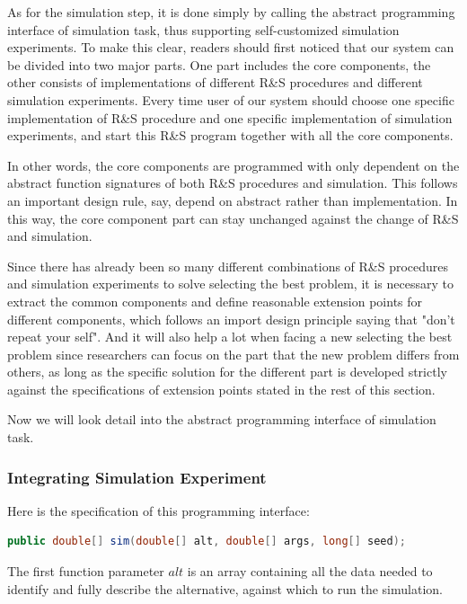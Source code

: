As for the simulation step, it is done simply by calling the abstract programming interface of simulation task, thus supporting self-customized simulation experiments. To make this clear, readers should first noticed that our system can be divided into two major parts. One part includes the core components, the other consists of implementations of different R\&S procedures and different simulation experiments. Every time user of our system should choose one specific implementation of R\&S procedure and one specific implementation of simulation experiments, and start this R\&S program together with all the core components.

In other words, the core components are programmed with only dependent on the abstract function signatures of both R\&S procedures and simulation. This follows an important design rule, say, depend on abstract rather than implementation. In this way, the core component part can stay unchanged against the change of R\&S and simulation.

Since there has already been so many different combinations of R\&S procedures and simulation experiments to solve selecting the best problem, it is necessary to extract the common components and define reasonable extension points for different components, which follows an import design principle saying that "don't repeat your self". And it will also help a lot when facing a new selecting the best problem since researchers can focus on the part that the new problem differs from others, as long as the specific solution for the different part is developed strictly against the specifications of extension points stated in the rest of this section.

Now we will look detail into the abstract programming interface of simulation task.

\subsubsection{Integrating Simulation Experiment}

Here is the specification of this programming interface:

\begin{lstlisting}[language=Java]
public double[] sim(double[] alt, double[] args, long[] seed);
\end{lstlisting}

The first function parameter $alt$ is an array containing all the data needed to identify and fully describe the alternative, against which to run the simulation.

